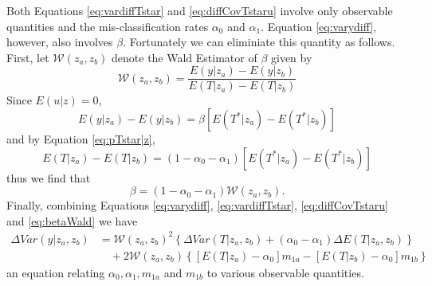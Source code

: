 Both Equations \ref{eq:vardiffTstar} and \ref{eq:diffCovTstaru} involve only observable quantities and the mis-classification rates $\alpha_0$ and $\alpha_1$.
Equation \ref{eq:varydiff}, however, also involves $\beta$.
Fortunately we can eliminiate this quantity as follows.
First, let $\mathcal{W}(z_a, z_b)$ denote the Wald Estimator of $\beta$ given by
\begin{equation}
  \mathcal{W}(z_a,z_b) = \frac{E(y|z_a) - E(y|z_b)}{E(T|z_a) - E(T|z_b)}
  \label{eq:waldab}
\end{equation}
Since $E(u|z) = 0$,
\begin{equation*}
  E(y|z_a) - E(y|z_b) = \beta \left[ E\left( T^*|z_a \right) - E\left( T^* | z_b \right) \right]
\end{equation*}
and by Equation \ref{eq:pTstar|z}, 
\begin{equation*}
  E(T|z_a) - E(T|z_b) = \left( 1 - \alpha_0 - \alpha_1 \right) \left[ E(T^*|z_a) - E(T^*|z_b) \right]
\end{equation*}
thus we find that
\begin{equation}
  \beta = (1 - \alpha_0 - \alpha_1) \mathcal{W}(z_a,z_b).
  \label{eq:betaWald}
\end{equation}
Finally, combining Equations \ref{eq:varydiff},  \ref{eq:vardiffTstar}, \ref{eq:diffCovTstaru} and \ref{eq:betaWald} we have
\begin{equation}
  \begin{split}
    \Delta Var(y|z_a,z_b)&= \mathcal{W}\left( z_a,z_b \right)^2 \left\{ \Delta Var(T|z_a,z_b) + (\alpha_0 - \alpha_1)\Delta E(T|z_a,z_b) \right\}\\
    &\quad + 2 \mathcal{W}(z_a,z_b) \left\{ \left[E\left( T|z_a \right) - \alpha_0\right] m_{1a} - \left[ E(T|z_b) - \alpha_0 \right] m_{1b}  \right\} 
  \end{split}
  \label{eq:homoskedcondition}
\end{equation}
an equation relating $\alpha_0, \alpha_1, m_{1a}$ and $m_{1b}$ to various observable quantities.

